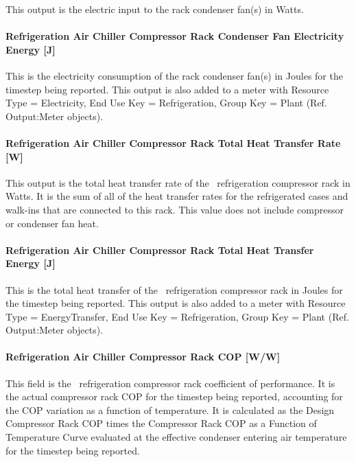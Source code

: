 This output is the electric input to the rack condenser fan(s) in Watts.

\paragraph{Refrigeration Air Chiller Compressor Rack Condenser Fan Electricity Energy {[}J{]}}\label{refrigeration-air-chiller-compressor-rack-condenser-fan-electric-energy-j}

This is the electricity consumption of the rack condenser fan(s) in Joules for the timestep being reported. This output is also added to a meter with Resource Type = Electricity, End Use Key = Refrigeration, Group Key = Plant (Ref. Output:Meter objects).

\paragraph{Refrigeration Air Chiller Compressor Rack Total Heat Transfer Rate {[}W{]}}\label{refrigeration-air-chiller-compressor-rack-total-heat-transfer-rate-w}

This output is the total heat transfer rate of the ~refrigeration compressor rack in Watts. It is the sum of all of the heat transfer rates for the refrigerated cases and walk-ins that are connected to this rack. This value does not include compressor or condenser fan heat.

\paragraph{Refrigeration Air Chiller Compressor Rack Total Heat Transfer Energy {[}J{]}}\label{refrigeration-air-chiller-compressor-rack-total-heat-transfer-energy-j}

This is the total heat transfer of the~ refrigeration compressor rack in Joules for the timestep being reported. This output is also added to a meter with Resource Type = EnergyTransfer, End Use Key = Refrigeration, Group Key = Plant (Ref. Output:Meter objects).

\paragraph{Refrigeration Air Chiller Compressor Rack COP {[}W/W{]}}\label{refrigeration-air-chiller-compressor-rack-cop-ww}

This field is the~ refrigeration compressor rack coefficient of performance. It is the actual compressor rack COP for the timestep being reported, accounting for the COP variation as a function of temperature. It is calculated as the Design Compressor Rack COP times the Compressor Rack COP as a Function of Temperature Curve evaluated at the effective condenser entering air temperature for the timestep being reported.


